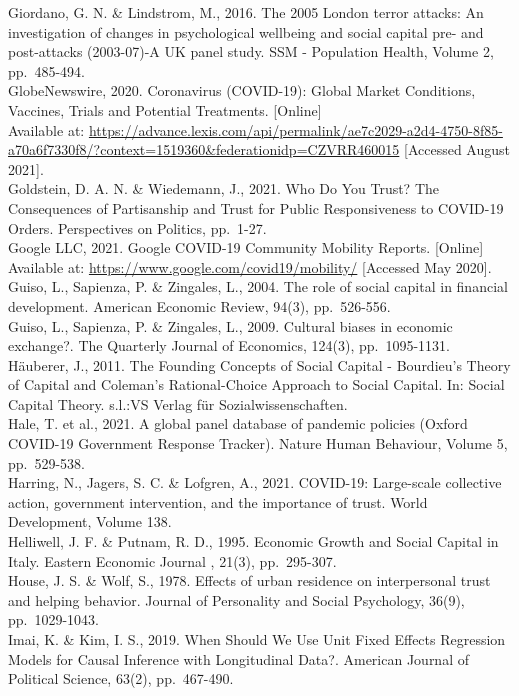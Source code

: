 \documentclass[
  12pt,
]{article}
\begin{document}
Giordano, G. N. \& Lindstrom, M., 2016. The 2005 London terror attacks: An investigation of changes in psychological wellbeing and social capital pre- and post-attacks (2003-07)-A UK panel study. SSM - Population Health, Volume 2, pp.~485-494.\\
GlobeNewswire, 2020. Coronavirus (COVID-19): Global Market Conditions, Vaccines, Trials and Potential Treatments. {[}Online{]}\\
Available at: \url{https://advance.lexis.com/api/permalink/ae7c2029-a2d4-4750-8f85-a70a6f7330f8/?context=1519360\&federationidp=CZVRR460015} {[}Accessed August 2021{]}.\\
Goldstein, D. A. N. \& Wiedemann, J., 2021. Who Do You Trust? The Consequences of Partisanship and Trust for Public Responsiveness to COVID-19 Orders. Perspectives on Politics, pp.~1-27.\\
Google LLC, 2021. Google COVID-19 Community Mobility Reports. {[}Online{]}\\
Available at: \url{https://www.google.com/covid19/mobility/} {[}Accessed May 2020{]}.\\
Guiso, L., Sapienza, P. \& Zingales, L., 2004. The role of social capital in financial development. American Economic Review, 94(3), pp.~526-556.\\
Guiso, L., Sapienza, P. \& Zingales, L., 2009. Cultural biases in economic exchange?. The Quarterly Journal of Economics, 124(3), pp.~1095-1131.\\
Häuberer, J., 2011. The Founding Concepts of Social Capital - Bourdieu's Theory of Capital and Coleman's Rational-Choice Approach to Social Capital. In: Social Capital Theory. s.l.:VS Verlag für Sozialwissenschaften.\\
Hale, T. et al., 2021. A global panel database of pandemic policies (Oxford COVID-19 Government Response Tracker). Nature Human Behaviour, Volume 5, pp.~529-538.\\
Harring, N., Jagers, S. C. \& Lofgren, A., 2021. COVID-19: Large-scale collective action, government intervention, and the importance of trust. World Development, Volume 138.\\
Helliwell, J. F. \& Putnam, R. D., 1995. Economic Growth and Social Capital in Italy. Eastern Economic Journal , 21(3), pp.~295-307.\\
House, J. S. \& Wolf, S., 1978. Effects of urban residence on interpersonal trust and helping behavior. Journal of Personality and Social Psychology, 36(9), pp.~1029-1043.\\
Imai, K. \& Kim, I. S., 2019. When Should We Use Unit Fixed Effects Regression Models for Causal Inference with Longitudinal Data?. American Journal of Political Science, 63(2), pp.~467-490.\\
\end{document}
